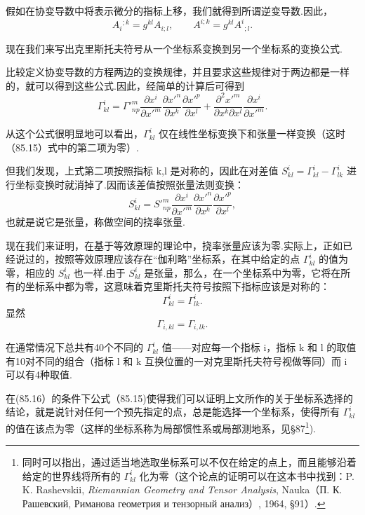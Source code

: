 假如在协变导数中将表示微分的指标上移，我们就得到所谓逆变导数.因此，
\begin{equation*}
  A_i{}^{;k}=g^{kl}A_{i;l},\qquad
  A^{i;k}=g^{kl}A^i{}_{;l}.
\end{equation*}

现在我们来写出克里斯托夫符号从一个坐标系变换到另一个坐标系的变换公式.

比较定义协变导数的方程两边的变换规律，并且要求这些规律对于两边都是一样的，就可以得到这些公式.因此，经简单的计算后可得到
\begin{equation}
  \Gamma^i_{kl}=\Gamma'^m_{np}
  \frac{\partial x^i}{\partial x'^m}
  \frac{\partial x'^n}{\partial x^k}
  \frac{\partial x'^p}{\partial x^l}
  +\frac{\partial^2 x'^m}{\partial x^k\partial x^l}
  \frac{\partial x^i}{\partial x'^m}.
\end{equation}

从这个公式很明显地可以看出，$\Gamma^i_{kl}$ 仅在线性坐标变换下和张量一样变换（这时（85.15）式中的第二项为零）.

但我们发现，上式第二项按照指标 k,l 是对称的，因此在对差值 $S^i_{kl}=\Gamma^i_{kl}-\Gamma^i_{lk}$ 进行坐标变换时就消掉了.因而该差值按照张量法则变换：
\begin{equation*}
  S^i_{kl}=S'^m_{np}\frac{\partial x^i}{\partial x'^m}
  \frac{\partial x'^n}{\partial x^k}
  \frac{\partial x'^p}{\partial x^l},
\end{equation*}
也就是说它是张量，称做空间的挠率张量.

现在我们来证明，在基于等效原理的理论中，挠率张量应该为零.实际上，正如已经说过的，按照等效原理应该存在“伽利略”坐标系，在其中给定的点 $\Gamma^i_{kl}$ 的值为零，相应的 $S^i_{kl}$ 也一样.由于 $S^i_{kl}$ 是张量，那么，在一个坐标系中为零，它将在所有的坐标系中都为零，这意味着克里斯托夫符号按照下指标应该是对称的：
\begin{equation}
  \Gamma^i_{kl}=\Gamma^i_{lk}.
\end{equation}
显然
\begin{equation}
  \Gamma_{i,kl}=\Gamma_{i,lk}.
\end{equation}

在通常情况下总共有40个不同的 $\Gamma^i_{kl}$ 值——对应每一个指标 i，指标 k 和 l 的取值有10对不同的组合（指标 l 和 k 互换位置的一对克里斯托夫符号视做等同）而 i 可以有4种取值.

在(85.16）的条件下公式（85.15)使得我们可以证明上文所作的关于坐标系选择的结论，就是说针对任何一个预先指定的点，总是能选择一个坐标系，使得所有 $\Gamma^i_{kl}$ 的值在该点为零（这样的坐标系称为局部惯性系或局部测地系，见§87\footnote{同时可以指出，通过适当地选取坐标系可以不仅在给定的点上，而且能够沿着给定的世界线将所有的 $\Gamma^i_{kl}$ 化为零（这个论点的证明可以在这本书中找到：P. K. Rashevskii, \textit{Riemannian Geometry and Tensor Analysis}, Nauka（П. К. Рашевский, Риманова геометрия и тензорный анализ）, 1964, §91）.}).

